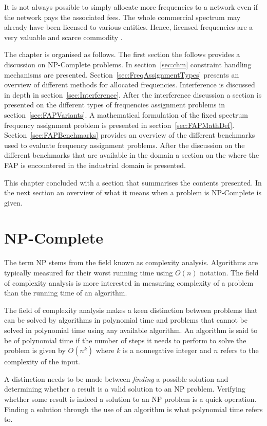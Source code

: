 It is not always possible to simply allocate more frequencies to a network even if the network pays the associated fees. The whole commercial spectrum may already have been licensed to various entities. Hence, licensed frequencies are a very valuable and scarce commodity \cite{FAPRAMColouring,FAPInCell}.

The chapter is organised as follows. The first section the follows provides a discussion on NP-Complete problems. In section~\ref{sec:chm} constraint handling mechanisms are presented. Section~\ref{sec:FreqAssignmentTypes} presents an overview of different methods for allocated frequencies. Interference is discussed in depth in section~\ref{sec:Interference}. After the interference discussion a section is presented on the different types of frequencies assignment problems in section~\ref{sec:FAPVariants}. A mathematical formulation of the fixed spectrum frequency assignment problem is presented in section~\ref{sec:FAPMathDef}. Section~\ref{sec:FAPBenchmarks} provides an overview of the different benchmarks used to evaluate frequency assignment problems. After the discussion on the different benchmarks that are available in the domain a section on the where the FAP is encountered in the industrial domain is presented. 

This chapter concluded with a section that summarises the contents presented. In the next section an overview of what it means when a problem is NP-Complete is given.

\section{NP-Complete}
\label{sec:NPComplete}
The term NP stems from the field known as complexity analysis. Algorithms are typically measured for their worst running time using $O(n)$ notation. The field of complexity analysis is more interested in measuring complexity of a problem than the running time of an algorithm\cite{AIModernApproach}.

The field of complexity analysis makes a keen distinction between problems that can be solved by algorithms in polynomial time and problems that cannot be solved in polynomial time using any available algorithm\cite{AIModernApproach}. An algorithm is said to be of polynomial time if the number of steps it needs to perform to solve the problem is given by $O(n^k)$ where $k$ is a nonnegative integer and $n$ refers to the complexity of the input\cite{AIModernApproach}.

A distinction needs to be made between \emph{finding} a possible solution and determining whether a result is a valid solution to an NP problem\cite{AIModernApproach}. Verifying whether some result is indeed a solution to an NP problem is a quick operation\cite{AIModernApproach}. Finding a solution through the use of an algorithm is what polynomial time refers to.

